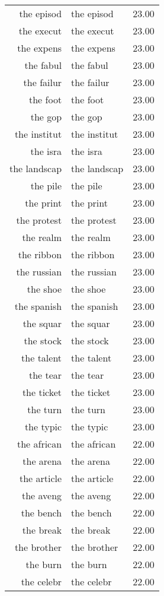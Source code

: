 \begin{table}[ht]
\begin{tabular}{rlr}
  the episod & the episod & 23.00 \\ 
  the execut & the execut & 23.00 \\ 
  the expens & the expens & 23.00 \\ 
  the fabul & the fabul & 23.00 \\ 
  the failur & the failur & 23.00 \\ 
  the foot & the foot & 23.00 \\ 
  the gop & the gop & 23.00 \\ 
  the institut & the institut & 23.00 \\ 
  the isra & the isra & 23.00 \\ 
  the landscap & the landscap & 23.00 \\ 
  the pile & the pile & 23.00 \\ 
  the print & the print & 23.00 \\ 
  the protest & the protest & 23.00 \\ 
  the realm & the realm & 23.00 \\ 
  the ribbon & the ribbon & 23.00 \\ 
  the russian & the russian & 23.00 \\ 
  the shoe & the shoe & 23.00 \\ 
  the spanish & the spanish & 23.00 \\ 
  the squar & the squar & 23.00 \\ 
  the stock & the stock & 23.00 \\ 
  the talent & the talent & 23.00 \\ 
  the tear & the tear & 23.00 \\ 
  the ticket & the ticket & 23.00 \\ 
  the turn & the turn & 23.00 \\ 
  the typic & the typic & 23.00 \\ 
  the african & the african & 22.00 \\ 
  the arena & the arena & 22.00 \\ 
  the article & the article & 22.00 \\ 
  the aveng & the aveng & 22.00 \\ 
  the bench & the bench & 22.00 \\ 
  the break & the break & 22.00 \\ 
  the brother & the brother & 22.00 \\ 
  the burn & the burn & 22.00 \\ 
  the celebr & the celebr & 22.00 \\ 

\end{tabular}
\end{table}
